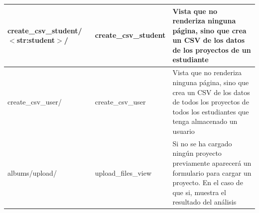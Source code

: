 \documentclass[a4paper, 12pt]{book}
\begin{document}
\begin{table}[H]
\begin{center}
\begin{tabular}{ | m{3.1cm} | m{3.3cm} | m{8.8cm} | }
        create\_csv\_student/ \newline $<$str:student$>$/ &
        create\_csv\_student &
        Vista que no renderiza ninguna página, sino que crea un CSV de los datos de los proyectos de un estudiante \\ \hline
        
        create\_csv\_user/ &
        create\_csv\_user &
        Vista que no renderiza ninguna página, sino que crea un CSV de los datos de todos los proyectos de todos los estudiantes que tenga almacenado un usuario \\ \hline
        
        albums/upload/ &
        upload\_files\_view &
        Si no se ha cargado ningún proyecto previamente aparecerá un formulario para cargar un proyecto. En el caso de que si, muestra el resultado del análisis \\ \hline 
    
      \end{tabular}
     \end{center}
    \end{table}
    
\end{document}

